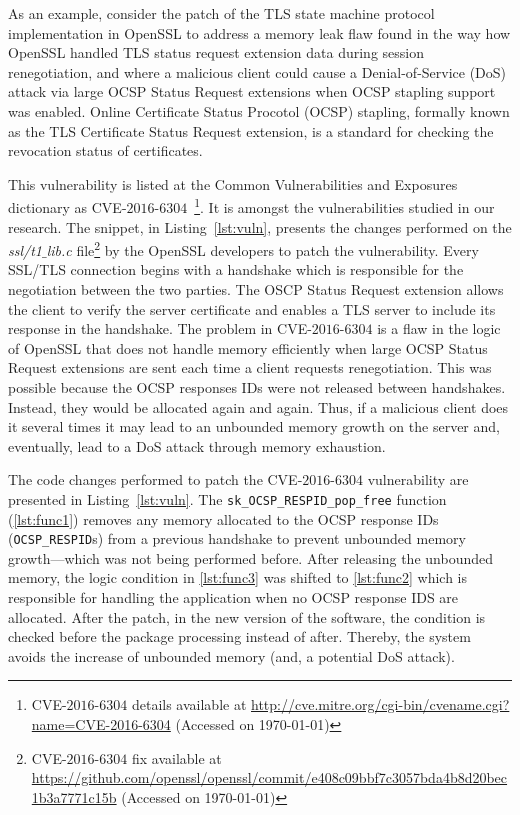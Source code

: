 \documentclass[smallextended]{svjour3}       %
\makeatletter
\newcommand\footnoteref[1]{\protected@xdef\@thefnmark{\ref{#1}}\@footnotemark}
\makeatother
\begin{document}
As an example, consider the patch of the TLS state machine protocol 
implementation in OpenSSL\footnoteref{openssl} to address a memory 
leak flaw found in the way how OpenSSL handled TLS status request 
extension data during session renegotiation, and where a malicious 
client could cause a Denial-of-Service (DoS) attack via large OCSP 
Status Request extensions when OCSP stapling support was enabled. 
Online Certificate Status Procotol (OCSP) stapling, formally known 
as the TLS Certificate Status Request extension, is a standard for 
checking the revocation status of certificates. 

This vulnerability is listed at the Common Vulnerabilities and 
Exposures dictionary as CVE-$2016$-$6304$~\footnote{CVE-$2016$-$6304$
details available at 
\url{http://cve.mitre.org/cgi-bin/cvename.cgi?name=CVE-2016-6304}
(Accessed on \today{})}. It is amongst the vulnerabilities studied 
in our research. The snippet, in Listing~\ref{lst:vuln}, presents 
the changes performed on the
\emph{ssl/t1$\_$lib.c} file\footnote{CVE-$2016$-$6304$ fix available 
 at
\url{https://github.com/openssl/openssl/commit/e408c09bbf7c3057bda4b8d20bec1b3a7771c15b}
(Accessed on \today{})} by the OpenSSL developers to patch the 
vulnerability. Every SSL/TLS connection begins with a handshake 
which is responsible for the negotiation between the two parties. 
The OSCP Status Request extension allows the client to verify the 
server certificate and enables a TLS server to include its response 
in the handshake. The problem in CVE-$2016$-$6304$ is a flaw in the 
logic of OpenSSL that does not handle memory efficiently when large 
OCSP Status Request extensions are sent each time a client requests 
renegotiation. This was possible because the OCSP responses IDs 
were not released between handshakes. Instead, they would be 
allocated again and again. Thus, if a malicious client does it 
several times it may lead to an unbounded memory growth on the 
server and, eventually, lead to a DoS attack through memory 
exhaustion. 

The code changes performed to patch the CVE-$2016$-$6304$ vulnerability are 
presented in Listing~\ref{lst:vuln}. The \texttt{sk\_OCSP\_RESPID\_pop\_free} function 
(\ref{lst:func1}) removes any memory allocated to the OCSP response IDs 
(\texttt{OCSP\_RESPID}s) from a previous handshake to prevent unbounded 
memory growth---which was not being performed before.
After releasing the unbounded memory, the logic condition in 
\ref{lst:func3} was shifted to \ref{lst:func2} which is responsible 
for handling the application when no OCSP response IDS are 
allocated. After the patch, in the new version of the software, the condition is checked before the package processing 
instead of after. Thereby, the system avoids the increase of unbounded memory (and, a potential DoS attack).
\end{document}
